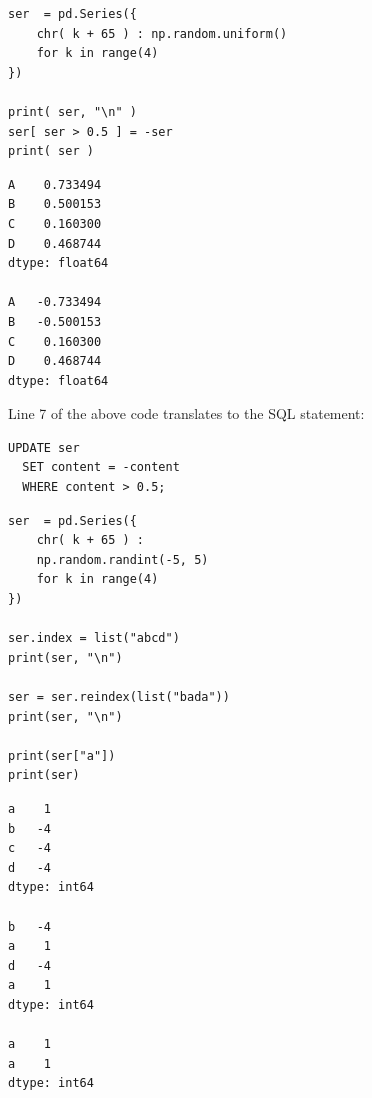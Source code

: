 \begin{frame}[fragile]
%
\begin{tcbraster}[raster columns=2,
                  raster equal height,
                  nobeforeafter,
                  raster column skip=0.5cm]
\begin{codebox}
\begin{verbatim}
ser  = pd.Series({
    chr( k + 65 ) : np.random.uniform()
    for k in range(4)
})

print( ser, "\n" )
ser[ ser > 0.5 ] = -ser
print( ser )
\end{verbatim}
\end{codebox}
%
\begin{cmdbox}
\begin{verbatim}
A    0.733494
B    0.500153
C    0.160300
D    0.468744
dtype: float64 

A   -0.733494
B   -0.500153
C    0.160300
D    0.468744
dtype: float64
\end{verbatim}
\end{cmdbox}
\end{tcbraster}
%
\begin{hintbox}
\scriptsize
Line 7 of the above code translates to the SQL statement:
\begin{verbatim}
UPDATE ser
  SET content = -content
  WHERE content > 0.5;
\end{verbatim}
\end{hintbox}
%
\end{frame}


\begin{frame}[fragile]
%
\begin{tcbraster}[raster columns=2,
                  raster equal height,
                  nobeforeafter,
                  raster column skip=0.5cm]
\begin{codebox}
\begin{verbatim}
ser  = pd.Series({
    chr( k + 65 ) :
    np.random.randint(-5, 5)
    for k in range(4)
})

ser.index = list("abcd")
print(ser, "\n")

ser = ser.reindex(list("bada"))
print(ser, "\n")

print(ser["a"])
print(ser)
\end{verbatim}
\end{codebox}
%
\begin{cmdbox}
\begin{verbatim}
a    1
b   -4
c   -4
d   -4
dtype: int64

b   -4
a    1
d   -4
a    1
dtype: int64

a    1
a    1
dtype: int64
\end{verbatim}
\end{cmdbox}
\end{tcbraster}
%
\end{frame}

